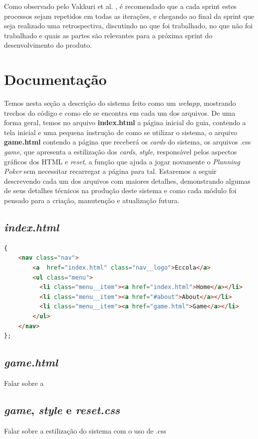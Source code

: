 Como observado pelo Vakkuri et al. \cite{ECCOLA}, é recomendado que a cada sprint estes processos sejam repetidos em todas as iterações, e chegando ao final da sprint que seja realizado uma retrospectiva, discutindo no que foi trabalhado, no que não foi trabalhado e quais as partes são relevantes para a próxima sprint do desenvolvimento do produto.



\section{Documentação}
Temos nesta seção a descrição do sistema feito como um \textit{webapp}, mostrando trechos do código e como ele se encontra em cada um dos arquivos. De uma forma geral, temos no arquivo \textbf{index.html} a página inicial do guia, contendo a tela inicial e uma pequena instrução de como se utilizar o sistema, o arquivo \textbf{game.html} contendo a página que receberá os \textit{cards} do sistema, os arquivos .css \textit{game}, que apresenta a estilização dos \textit{cards}, \textit{style}, responsável pelos aspectos gráficos dos HTML e \textit{reset}, a função que ajuda a jogar novamente o \textit{Planning Poker} sem necessitar recarregar a página para tal. Estaremos a seguir descrevendo cada um dos arquivos com maiores detalhes, demonstrando algumas de seus detalhes técnicos na produção deste sistema e como cada módulo foi pensado para a criação, manutenção e atualização futura.

\subsection{\textit{index.html}}
\begin{lstlisting}[language=HTML, caption=JavaScript example]{
    <nav class="nav">
        <a  href="index.html" class="nav__logo">Eccola</a>
        <ul class="menu">
          <li class="menu__item"><a href="index.html">Home</a></li>
          <li class="menu__item"><a href="#about">About</a></li>
          <li class="menu__item"><a href="game.html">Game</a></li>
        </ul>
    </nav>
};
\end{lstlisting}

\subsection{\textit{game.html}}
Falar sobre a 

\subsection{\textit{game}, \textit{style} e \textit{reset.css}}
Falar sobre a estilização do sistema com o uso de .css

